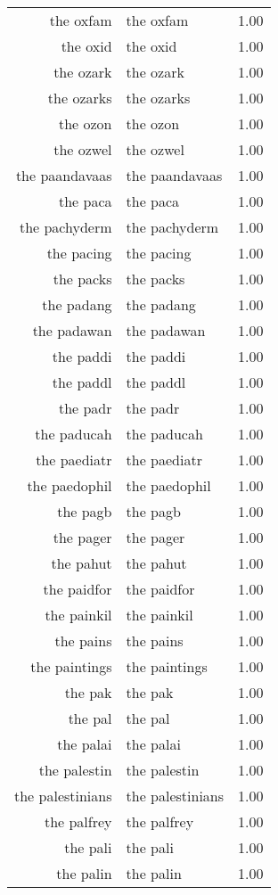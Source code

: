 \begin{table}[ht]
\begin{tabular}{rlr}
  the oxfam & the oxfam & 1.00 \\ 
  the oxid & the oxid & 1.00 \\ 
  the ozark & the ozark & 1.00 \\ 
  the ozarks & the ozarks & 1.00 \\ 
  the ozon & the ozon & 1.00 \\ 
  the ozwel & the ozwel & 1.00 \\ 
  the paandavaas & the paandavaas & 1.00 \\ 
  the paca & the paca & 1.00 \\ 
  the pachyderm & the pachyderm & 1.00 \\ 
  the pacing & the pacing & 1.00 \\ 
  the packs & the packs & 1.00 \\ 
  the padang & the padang & 1.00 \\ 
  the padawan & the padawan & 1.00 \\ 
  the paddi & the paddi & 1.00 \\ 
  the paddl & the paddl & 1.00 \\ 
  the padr & the padr & 1.00 \\ 
  the paducah & the paducah & 1.00 \\ 
  the paediatr & the paediatr & 1.00 \\ 
  the paedophil & the paedophil & 1.00 \\ 
  the pagb & the pagb & 1.00 \\ 
  the pager & the pager & 1.00 \\ 
  the pahut & the pahut & 1.00 \\ 
  the paidfor & the paidfor & 1.00 \\ 
  the painkil & the painkil & 1.00 \\ 
  the pains & the pains & 1.00 \\ 
  the paintings & the paintings & 1.00 \\ 
  the pak & the pak & 1.00 \\ 
  the pal & the pal & 1.00 \\ 
  the palai & the palai & 1.00 \\ 
  the palestin & the palestin & 1.00 \\ 
  the palestinians & the palestinians & 1.00 \\ 
  the palfrey & the palfrey & 1.00 \\ 
  the pali & the pali & 1.00 \\ 
  the palin & the palin & 1.00 \\ 

\end{tabular}
\end{table}
